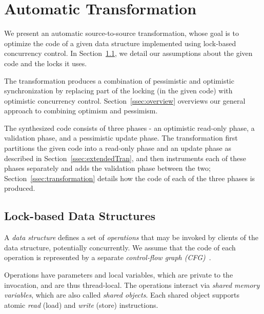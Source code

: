 \renewcommand{\ttdefault}{pcr}
\algrenewcommand{}
\algrenewcommand{}
\algrenewcommand{}
\algrenewcommand{}
\algrenewcommand{}
\algrenewcommand\textproc{\textit}
\newcommand{\codesize}{\footnotesize}



\section{Automatic Transformation}\label{sec:algorithm}

We present an automatic source-to-source transformation, whose
goal is to optimize the code of a given data structure implemented using lock-based concurrency control.
In Section~\ref{ssec:locks}, we detail our assumptions about the given code and the locks it uses.

The transformation produces a combination of pessimistic and optimistic synchronization
by replacing part of the locking (in the given code) with optimistic concurrency control.
Section~\ref{ssec:overview} overviews our general approach to combining optimism and pessimism.

The synthesized code consists of three phases - an optimistic read-only phase, a validation phase,
and a pessimistic update phase. The transformation first partitions the given code into a read-only phase and
an update phase as described in Section~\ref{ssec:extendedTran}, and
then instruments each of these phases separately and adds the validation phase between the two;
Section~\ref{ssec:transformation} details how the code of each of the three phases is produced.

\subsection{Lock-based Data Structures}\label{ssec:locks}

A \emph{data structure} defines a set of \emph{operations} that may be invoked by
clients of the data structure, potentially concurrently.
We assume that the code of each operation is represented by a separate \emph{control-flow graph (CFG)}~\cite{Grune:2000}.

Operations have parameters and local variables, which are private to the invocation, and are thus thread-local.
%
The operations interact via \emph{shared memory variables}, which are also called \emph{shared objects}.
%
Each shared object supports atomic \emph{read} (load) and \emph{write} (store) instructions.
%


